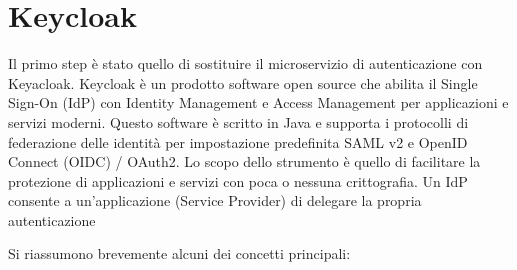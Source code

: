 \documentclass{article}
\begin{document}
\section{Keycloak}

Il primo step è stato quello di sostituire il microservizio di autenticazione con Keyacloak. Keycloak è un
prodotto software open source che abilita il Single Sign-On (IdP) con Identity Management e
Access Management per applicazioni e servizi moderni. Questo software è scritto in Java e
supporta i protocolli di federazione delle identità per impostazione predefinita SAML v2 e
OpenID Connect (OIDC) / OAuth2. Lo scopo dello strumento è quello di facilitare la protezione
di applicazioni e servizi con poca o nessuna crittografia. Un IdP consente a un'applicazione
(Service Provider) di delegare la propria autenticazione %

Si riassumono brevemente alcuni dei concetti principali:
\end{document}
